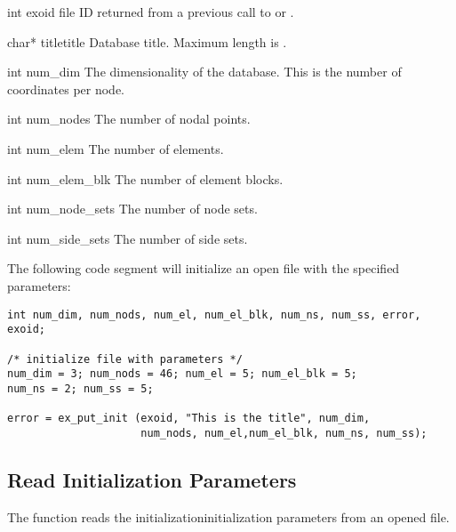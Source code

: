 
\begin{parameters}
\item[int exoid \R{}]
\exo{} file ID returned from a previous call to  
or .

\item[{char* titletitle \R{}}]
Database title. Maximum length is .

\item[{int num_dim \R{}}]
The dimensionality of the database. This is the number of coordinates
per node.

\item[{int num_nodes \R{}}] 
The number of nodal points.

\item[{int num_elem \R{}}]
The number of elements.

\item[{int num_elem_blk \R{}}]
The number of element blocks.

\item[{int num_node_sets \R{}}]
The number of node sets.

\item[{int num_side_sets \R{}}]
The number of side sets.
\end{parameters}

The following code segment will initialize an open \exo{} file with
the specified parameters:

\begin{lstlisting}
int num_dim, num_nods, num_el, num_el_blk, num_ns, num_ss, error, exoid;

/* initialize file with parameters */
num_dim = 3; num_nods = 46; num_el = 5; num_el_blk = 5;
num_ns = 2; num_ss = 5;

error = ex_put_init (exoid, "This is the title", num_dim, 
                     num_nods, num_el,num_el_blk, num_ns, num_ss);
\end{lstlisting}


\subsection{Read Initialization Parameters}

The function  reads the
initializationinitialization parameters from an opened
\exo{} file.

